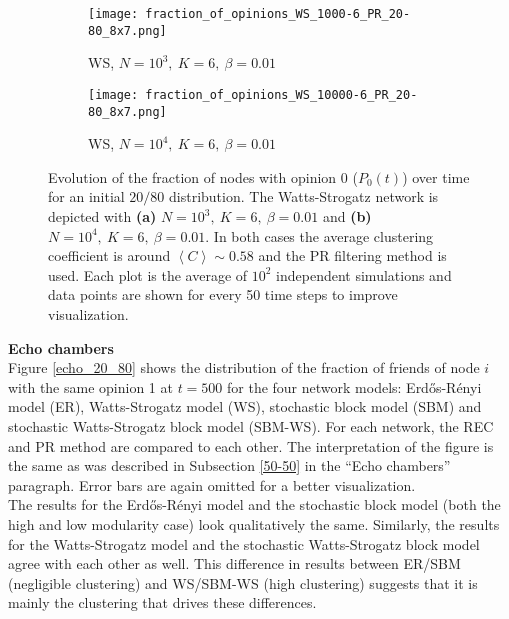 \documentclass[11 pt , letterpaper , twoside , openright]{book}
\begin{document}
\begin{figure}[H]
  \begin{subfigure}[b]{0.49\textwidth}
  	\texttt{[image: fraction\_of\_opinions\_WS\_1000-6\_PR\_20-80\_8x7.png]}
    \caption{WS, $N = 10^3,\ K=6,\ \beta=0.01$}
    \label{ws1000}
  \end{subfigure}
  \begin{subfigure}[b]{0.49\textwidth}
  	\texttt{[image: fraction\_of\_opinions\_WS\_10000-6\_PR\_20-80\_8x7.png]}
    \caption{WS, $N = 10^4,\ K=6,\ \beta=0.01$}
    \label{ws10000}
  \end{subfigure}
  \captionsetup{format=plain}
  \caption[Evolution of the fraction of nodes with opinion 0 ($P_0(t)$) over time for an initial $20/80$ opinion distribution for a WS model with $N=10^3$ or $N=10^4$, $K=6$ and $\beta = 0.01$, PR.]{Evolution of the fraction of nodes with opinion 0 ($P_0(t)$) over time for an initial $20/80$ distribution. The Watts-Strogatz network is depicted with \textbf{(a)} $N=10^3,\ K=6,\ \beta=0.01$ and \textbf{(b)} $N=10^4,\ K=6,\ \beta=0.01$. In both cases the average clustering coefficient is around $\left<C\right> \sim 0.58$ and the PR filtering method is used. Each plot is the average of $10^2$ independent simulations and data points are shown for every 50 time steps to improve visualization.}
\label{ev_op_WS_k=6}
\end{figure}
\noindent
\textbf{Echo chambers}\\
\newline
Figure \ref{echo_20_80} shows the distribution of the fraction of friends of node $i$ with the same opinion 1 at $t=500$ for the four network models: Erd\H{o}s-R\'{e}nyi model (ER), Watts-Strogatz model (WS), stochastic block model (SBM) and stochastic Watts-Strogatz block model (SBM-WS). For each network, the REC and PR method are compared to each other. The interpretation of the figure is the same as was described in Subsection \ref{50-50} in the ``Echo chambers'' paragraph. Error bars are again omitted for a better visualization.\\
The results for the Erd\H{o}s-R\'{e}nyi model and the stochastic block model (both the high and low modularity case) look qualitatively the same. Similarly, the results for the Watts-Strogatz model and the stochastic Watts-Strogatz block model agree with each other as well. This difference in results between ER/SBM (negligible clustering) and WS/SBM-WS (high clustering) suggests that it is mainly the clustering that drives these differences.\\
\end{document}
